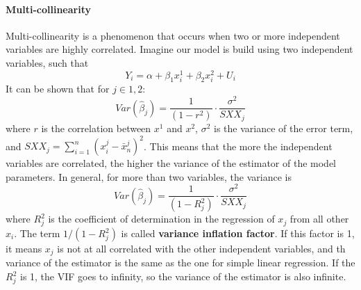\paragraph{Multi-collinearity}
Multi-collinearity is a phenomenon that occurs when two or more independent variables are highly correlated. Imagine our model is build using two independent variables, such that
\begin{equation*}
    Y_i = \alpha + \beta_1 x_i^1 + \beta_2 x_i^2 + U_i
\end{equation*}
It can be shown that for $j \in {1,2}$:
\begin{equation*}
    Var(\hat{\beta}_j) = \frac{1}{(1 - r^2)} \cdot \frac{\sigma^2}{SXX_j}
\end{equation*}
where $r$ is the correlation between $x^1$ and $x^2$, $\sigma^2$ is the variance of the error term, and $SXX_j = \sum_{i=1}^n (x_i^j - \bar{x}_n^j)^2$. This means that the more the independent variables are correlated, the higher the variance of the estimator of the model parameters. In general, for more than two variables, the variance is
\begin{equation*}
    Var(\hat{\beta}_j) = \frac{1}{(1 - R_j^2)} \cdot \frac{\sigma^2}{SXX_j}
\end{equation*}
where $R_j^2$ is the coefficient of determination in the regression of $x_j$ from all other $x_i$. The term $1/(1-R_j^2)$ is called \textbf{variance inflation factor}. If this factor is 1, it means $x_j$ is not at all correlated with the other independent variables, and th variance of the estimator is the same as the one for simple linear regression. If the $R_j^2$ is 1, the VIF goes to infinity, so the variance of the estimator is also infinite.

